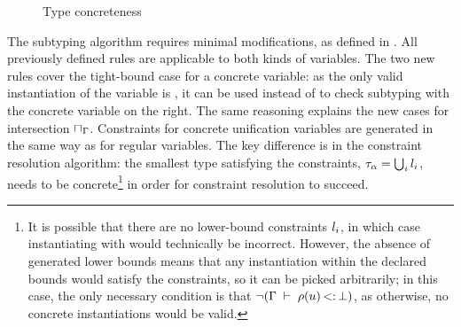 \begin{figure}[t]
\footnotesize
{}
\caption{Type concreteness}\label{fig:concrete}
\end{figure}

The subtyping algorithm requires minimal modifications, 
as defined in .
All previously defined rules are applicable to both kinds of variables.
The two new rules cover the tight-bound case for a concrete variable: as the only 
valid instantiation of the variable is \tyub, it can be used
instead of \tybot to check subtyping with the concrete variable on the right.
The same reasoning explains the new cases for intersection $\sqcap_\Gamma$.
Constraints for concrete unification variables are generated in the same way
as for regular variables. The key difference is in the constraint resolution
algorithm: the smallest type satisfying the constraints, 
$\tau_{\alpha} = \textstyle\bigcup_i l_i$,
needs to be concrete\footnote{
    It is possible that there are no lower-bound constraints $l_i$,
    in which case instantiating \va with \tybot would technically be incorrect.
    However, the absence of generated lower bounds means that any instantiation
    within the declared bounds would satisfy the constraints, so it can 
    be picked arbitrarily; in this case,
    the only necessary condition is that
    $\lnot (\Gamma\;\vdash\;\rho(u) \operatorname{<:} \bot)$,
    as otherwise, no concrete instantiations would be valid.
} in order for constraint resolution to succeed.

